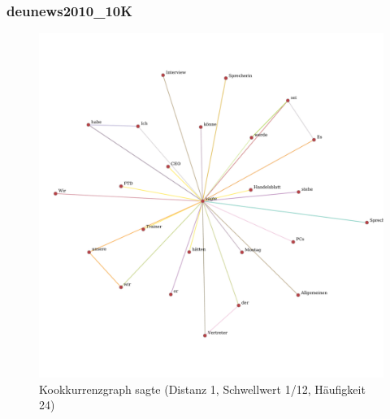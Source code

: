 \documentclass[11pt, a4paper]{article}
\begin{document}
\pagebreak
\subsubsection{deunews2010\_10K}

\begin{figure}[hp!]
    \centering
        \includegraphics[scale=.4]{../../data/results/cooc_denews10k/topwords/graph_sagte.pdf}
    \caption{Kookkurrenzgraph sagte (Distanz 1, Schwellwert 1/12, Häufigkeit 24)}
    \label{fig:hw-sagte}
\end{figure}
\end{document}
